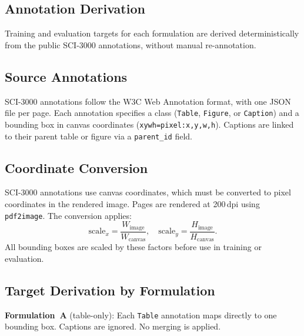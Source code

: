\documentclass[pdflatex,sn-mathphys-num,iicol]{sn-jnl}
\begin{document}
\begin{appendices}

\section{Annotation Derivation}\label{app:annotations}

Training and evaluation targets for each formulation are derived deterministically
from the public SCI-3000 annotations, without manual re-annotation.

\subsection*{Source Annotations}

SCI-3000 annotations follow the W3C Web Annotation format, with one JSON file per
page. Each annotation specifies a class (\texttt{Table}, \texttt{Figure}, or
\texttt{Caption}) and a bounding box in canvas coordinates
(\texttt{xywh=pixel:x,y,w,h}). Captions are linked to their parent table or figure
via a \texttt{parent\_id} field.

\subsection*{Coordinate Conversion}

SCI-3000 annotations use canvas coordinates, which must be converted to pixel
coordinates in the rendered image. Pages are rendered at 200\,dpi using
\texttt{pdf2image}. The conversion applies:
\begin{equation*}
\text{scale}_x = \frac{W_{\text{image}}}{W_{\text{canvas}}}, \quad
\text{scale}_y = \frac{H_{\text{image}}}{H_{\text{canvas}}}.
\end{equation*}
All bounding boxes are scaled by these factors before use in training or evaluation.

\subsection*{Target Derivation by Formulation}

\textbf{Formulation~A} (table-only): Each \texttt{Table} annotation maps directly to
one bounding box. Captions are ignored. No merging is applied.


\end{appendices}
\end{document}
